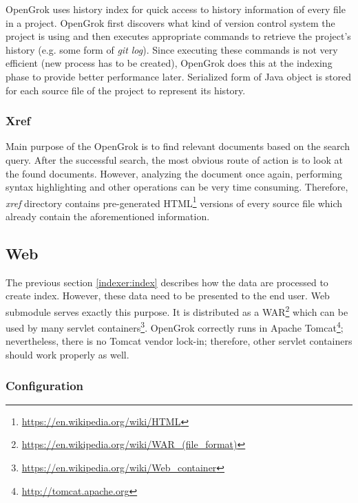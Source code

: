OpenGrok uses history index for quick access to history information of every file in a project. OpenGrok first discovers
what kind of version control system the project is using and then executes appropriate commands to retrieve the project's
history (e.g. some form of \textit{git log}). Since executing these commands is not very efficient (new process has to
be created), OpenGrok does this at the indexing phase to provide better performance later. Serialized form of Java object
is stored for each source file of the project to represent its history.

\subsubsection{Xref}
\label{indexer:xref}

Main purpose of the OpenGrok is to find relevant documents based on the search query. After the successful search, the most
obvious route of action is to look at the found documents. However, analyzing the document once again, performing syntax
highlighting and other operations can be very time consuming. Therefore, \textit{xref} directory contains pre-generated
HTML\footnote{\url{https://en.wikipedia.org/wiki/HTML}} versions of every source file which already contain the
aforementioned information.

\subsection{Web}
\label{opengrok-web}

The previous section \ref{indexer:index} describes how the data are processed to create index. However, these data need
to be presented to the end user. Web submodule serves exactly this purpose. It is distributed as a
WAR\footnote{\url{https://en.wikipedia.org/wiki/WAR\_(file\_format)}} which can be used by many
servlet containers\footnote{\url{https://en.wikipedia.org/wiki/Web\_container}}. OpenGrok correctly runs in
Apache Tomcat\footnote{\url{http://tomcat.apache.org}}; nevertheless, there is no Tomcat vendor lock-in; therefore,
other servlet containers should work properly as well.

\subsubsection{Configuration}
\label{opengrok_configuration}


